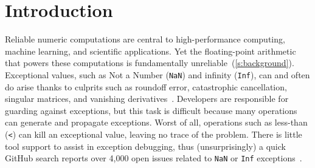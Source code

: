 \documentclass{juliacon}
\begin{document}
\setlength{\parindent}{10pt}


\maketitle

\begin{abstract}
  Reliable numerical computations are central to scientific computing,
  but the floating-point arithmetic that enables large-scale models
  is fundamentally unreliable.
  Numeric exceptions are a common occurrence and can propagate through
  code, leading to flawed results.
  This paper presents FlowFPX, a toolkit for systematically debugging
  floating-point exceptions by recording their flow,
  coalescing exception contexts, and fuzzing in select locations.
  These tools help scientists discover when exceptions happen
  and track down their origin, smoothing the way to a reliable codebase.
\end{abstract}

\newcommand{\code}[1]{\texttt{#1}}
\newcommand{\FlowFPX}{FlowFPX}
\newcommand{\GPUFPX}{GPU-FPX}
\newcommand{\FloatTracker}{FloatTracker}
\newcommand{\FT}{\FloatTracker}
\newcommand{\Fp}{Floating-point} %
\newcommand{\fp}{floating-point} %
\newcommand{\CSTG}{stack graph}
\newcommand{\CPP}{\code{C++}}
\newcommand{\Dendro}{\textsc{Dendro}}
\newcommand{\urlaccess}[2]{\url{#1}}
\newcommand{\Nan}{\code{NaN}}
\newcommand{\NaN}{\Nan}
\newcommand{\Inf}{\code{Inf}}
\newcommand{\zerowidth}[1]{\makebox[0pt][l]{#1}}
\newcommand{\zerocode}[1]{\zerowidth{\code{#1}}}

\section{Introduction}

Reliable numeric computations are central to high-performance computing,
machine learning, and scientific applications.
Yet the \fp{} arithmetic that powers these computations is fundamentally
unreliable~(\cref{s:background}).
Exceptional values, such as Not a Number (\Nan{}) and infinity (\Inf{}),
can and often do arise thanks to culprits such as roundoff error,
catastrophic cancellation, singular matrices, and vanishing
derivatives~\cite{sdjmrstp-pc-2022,ddghlllprr-correctness-2022,gllprt-correctness-2021,fpchecker-reports,llg-soap-2022,bllmg-xloop-2022}.
Developers are responsible for guarding against exceptions, but this task
is difficult because many operations can generate and propagate exceptions.
Worst of all, operations such as less-than (\code{<}) can kill an exceptional value,
leaving no trace of the problem.
There is little tool support to assist in exception debugging,
thus (unsurprisingly) a quick GitHub search reports over 4,000 open issues
related to \NaN{} or \Inf{} exceptions~\cite{github-issues}.
\end{document}
